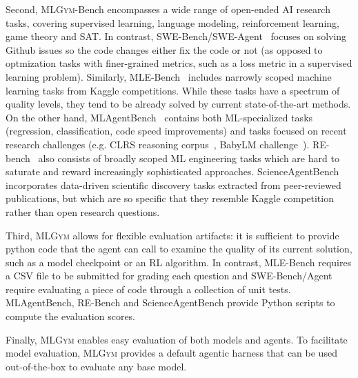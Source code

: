 \documentclass[]{fairmeta}
\newcommand{\mlgym}{\fontfamily{lmr}\selectfont\mdseries\textsc{MLGym}\xspace}
\begin{document}
Second, \mlgym-Bench encompasses a wide range of open-ended AI research tasks, covering supervised learning, language modeling, reinforcement learning, game theory and SAT.  
In contrast, SWE-Bench/SWE-Agent~\citep{yangSWEagentAgentComputerInterfaces2024} focuses on solving Github issues so the code changes either fix the code or not (as opposed to optmization tasks with finer-grained metrics, such as a loss metric in a supervised learning problem).
%
Similarly, MLE-Bench~\citep{chanMLEbenchEvaluatingMachine2024} includes narrowly scoped machine learning tasks from Kaggle competitions.
% 
While these tasks have a spectrum of quality levels, they tend to be already solved by current state-of-the-art methods. 
On the other hand, MLAgentBench~\citep{huangMLAgentBenchEvaluatingLanguage2024} contains both ML-specialized tasks (regression, classification, code speed improvements) and tasks focused on recent research challenges (e.g. CLRS reasoning corpus~\citep{velivckovic2022clrs}, BabyLM challenge~\citep{oba2023babylm}).
RE-bench~\citep{rebench-metr} also consists of broadly scoped ML engineering tasks which are hard to saturate and reward increasingly sophisticated approaches.
ScienceAgentBench~\citep{chenScienceAgentBenchRigorousAssessment2024} incorporates data-driven scientific discovery tasks extracted from peer-reviewed publications, but which are so specific that they resemble Kaggle competition rather than open research questions. 

Third, \mlgym allows for flexible evaluation artifacts: it is sufficient to provide python code that the agent can call to examine the quality of its current solution, such as a model checkpoint or an RL algorithm.
In contrast, MLE-Bench requires a CSV file to be submitted for grading each question and SWE-Bench/Agent require evaluating a piece of code through a collection of unit tests. MLAgentBench, RE-Bench and ScienceAgentBench provide Python scripts to compute the evaluation scores.

Finally, \mlgym enables easy evaluation of both models and agents. To facilitate model evaluation, \mlgym provides a default agentic harness that can be used out-of-the-box to evaluate any base model.
\end{document}
